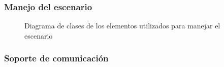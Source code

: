 \documentclass[a4paper]{article}
\begin{document}
\subsubsection{Manejo del escenario}

\begin{figure}[!h]
	\caption{Diagrama de clases de los elementos utilizados para manejar el escenario}
	\label{fig:diagrama4}
\end{figure}

\subsubsection{Soporte de comunicación}
\end{document}
